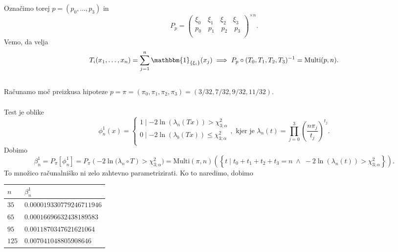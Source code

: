 \documentclass[ letterpaper, titlepage, fleqn]{article}
\newcommand{\ind}{\mathbbm{1}}
\begin{document}
\section{}
Označimo torej $p = (p_0, \dots, p_3)$ in
$$
P_p = \left(
\begin{array}{ll}
\xi_0 \quad \xi_1 \quad \xi_2 \quad \xi_3 \\
p_0 \quad p_1 \quad p_2 \quad p_3 \\
\end{array}
\right)^{\times n}.
$$
Vemo, da velja
$$T_i(x_1, \dots, x_n) = \sum_{j=1}^n \ind_{\{\xi_i\}}(x_j) \implies P_p \circ (T_0, T_1, T_2, T_{3})^{-1} = \text{Multi}(p,n).$$
\subsection{}
Računamo moč preizkusa hipoteze $p = \pi = (\pi_0, \pi_1, \pi_2, \pi_3) =  (3/32, 7/32, 9/32, 11/32)$.
\subsubsection{}
Test je oblike
$$
\phi^1_n(x)= 
\begin{cases}
1 \mid  -2 \ln(\lambda_n(Tx)) > \chi_{3; \alpha}^2 \\
0 \mid  -2 \ln(\lambda_b(Tx)) \leq \chi_{3; \alpha}^2 \\
\end{cases}, \text{ kjer je }
\lambda_n(t) = \prod_{j=0}^3 \left(\frac{n \pi_j}{t_j}\right)^{t_j}.
$$
Dobimo
\begin{equation*}
\beta^1_n = P_\pi[\phi^1_n] = P_\pi\left(-2\ln(\lambda_n \circ T\right) > \chi_{3;\alpha}^2) =
 \text{Multi}(\pi,n)\left(\left\{t\mid t_0 + t_1 + t_2 + t_3 = n \;\land\; -2\ln(\lambda_n(t)) > \chi_{3;\alpha}^2\right\}\right).
\end{equation*}
To množico računalniško ni zelo zahtevno parametrizirati. Ko to naredimo, dobimo
\begin{center}
\begin{tabular}{|l|l| }
\hline
$n$ & $\beta^1_n$ \\
\hline
$35$ & $0.000019330779246711946$ \\
$65$ & $0.00016696632438189583$ \\
$95$ & $0.0011870347621621064$ \\
$125$ & $0.007041048805908646$  \\
\hline
\end{tabular}
\end{center}
\end{document}
